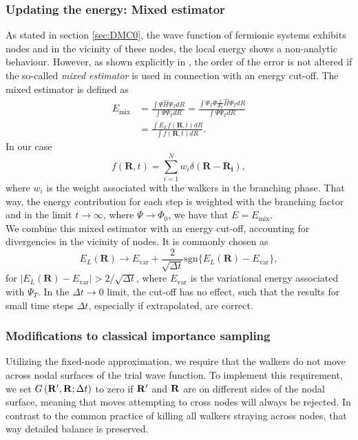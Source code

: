 \subsubsection*{Updating the energy: Mixed estimator}
As stated in section \ref{sec:DMC0}, the wave function of fermionic systems exhibits nodes and in the vicinity of these nodes, the local energy  shows a non-analytic behaviour. However, as shown explicitly in \cite{PhysRev991}, the order of the error is not altered if the so-called \textit{mixed estimator} is used in connection with an energy cut-off. The mixed estimator is defined as
\begin{align*}
E_{\text{mix}} &= \frac{\int \Psi \hat{H} \Psi_T dR}{\int \Psi \Psi_T dR} = \frac{\int \Psi_T \Psi \frac{1}{\Psi_T} \hat{H} \Psi_T dR}{\int \Psi \Psi_T dR}\\
&= \frac{\int E_L f(\mathbf{R},t) dR}{\int f(\mathbf{R},t) dR}.
\end{align*}
In our case
\[
f(\mathbf{R},t) = \sum\limits_{i=1}^N w_i \delta(\mathbf{R}-\mathbf{R_i}),
\]
where $w_i$ is the weight associated with the walkers in the branching phase. That way, the energy contribution for each step is weighted with the branching factor and in the limit $t \rightarrow\infty$, where $\Psi\rightarrow \Phi_0$, we have that $E = E_{\text{mix}}$. \\
We combine this mixed estimator  with an energy cut-off, accounting for divergencies in the vicinity of nodes. It is commonly chosen as
\[
E_L(\mathbf{R}) \rightarrow E_{\text{var}} + \frac{2}{\sqrt{\Delta t}} \text{sgn}\lbrace E_L(\mathbf{R}) - E_{\text{var}}\rbrace,
\]
for $|E_L(\mathbf{R}) - E_{\text{var}}| > 2/\sqrt{\Delta t}$, where $E_{\text{var}}$ is the variational energy associated with $\Psi_T$. In the $\Delta t \rightarrow 0$ limit, the cut-off has no effect, such that the results for small time steps $\Delta t$, especially if extrapolated, are correct.

\subsubsection*{Modifications to classical importance sampling}
Utilizing the fixed-node approximation, we require that the walkers do not move across nodal surfaces of the trial wave function. To implement this requirement,  we set $G\left(\mathbf{R}',\mathbf{R};\Delta t\right)$ to zero if $\mathbf{R}'$ and $\mathbf{R}$ are on different sides of the nodal surface, meaning that moves  attempting to cross nodes will always be rejected. In contrast to the common practice of killing all walkers straying across nodes, that way detailed balance is preserved.

